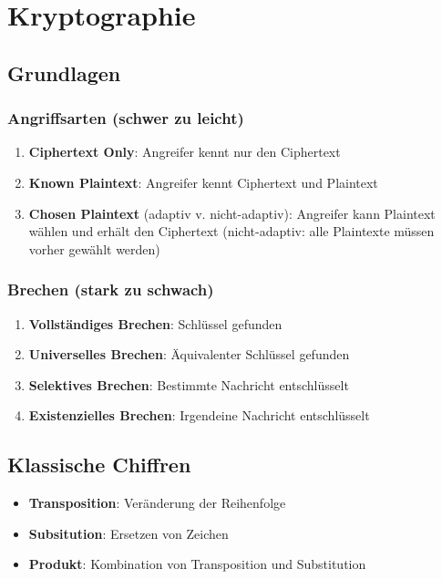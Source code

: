 \documentclass{article}
\author{Leopold Lemmermann}
\begin{document}
\createtitle

\section{Kryptographie}



\subsection{Grundlagen}
\subsubsection{Angriffsarten (schwer zu leicht)}
\begin{enumerate}
  \item \textbf{Ciphertext Only}: Angreifer kennt nur den Ciphertext
  \item \textbf{Known Plaintext}: Angreifer kennt Ciphertext und Plaintext
  \item \textbf{Chosen Plaintext} (adaptiv v. nicht-adaptiv): Angreifer kann Plaintext wählen und erhält den Ciphertext (nicht-adaptiv: alle Plaintexte müssen vorher gewählt werden)
\end{enumerate}

\subsubsection{Brechen (stark zu schwach)}
\begin{enumerate}
  \item \textbf{Vollständiges Brechen}: Schlüssel gefunden
  \item \textbf{Universelles Brechen}: Äquivalenter Schlüssel gefunden
  \item \textbf{Selektives Brechen}: Bestimmte Nachricht entschlüsselt
  \item \textbf{Existenzielles Brechen}: Irgendeine Nachricht entschlüsselt
\end{enumerate}




\subsection{Klassische Chiffren}
\begin{itemize}
  \item \textbf{Transposition}: Veränderung der Reihenfolge
  \item \textbf{Subsitution}: Ersetzen von Zeichen
  \item \textbf{Produkt}: Kombination von Transposition und Substitution
\end{itemize}
\end{document}
